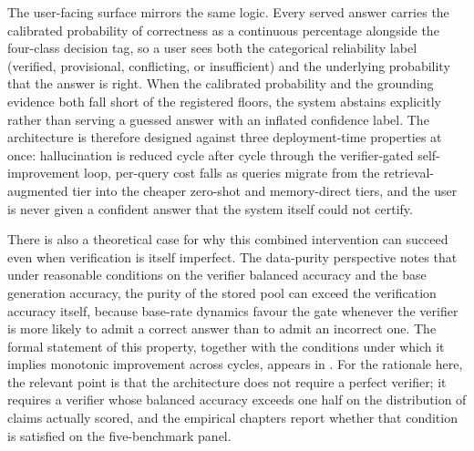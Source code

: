 The user-facing surface mirrors the same logic. Every served answer carries the calibrated probability of correctness as a continuous percentage alongside the four-class decision tag, so a user sees both the categorical reliability label (verified, provisional, conflicting, or insufficient) and the underlying probability that the answer is right. When the calibrated probability and the grounding evidence both fall short of the registered floors, the system abstains explicitly rather than serving a guessed answer with an inflated confidence label. The architecture is therefore designed against three deployment-time properties at once: hallucination is reduced cycle after cycle through the verifier-gated self-improvement loop, per-query cost falls as queries migrate from the retrieval-augmented tier into the cheaper zero-shot and memory-direct tiers, and the user is never given a confident answer that the system itself could not certify.

There is also a theoretical case for why this combined intervention can succeed even when verification is itself imperfect. The data-purity perspective notes that under reasonable conditions on the verifier balanced accuracy and the base generation accuracy, the purity of the stored pool can exceed the verification accuracy itself, because base-rate dynamics favour the gate whenever the verifier is more likely to admit a correct answer than to admit an incorrect one. The formal statement of this property, together with the conditions under which it implies monotonic improvement across cycles, appears in . For the rationale here, the relevant point is that the architecture does not require a perfect verifier; it requires a verifier whose balanced accuracy exceeds one half on the distribution of claims actually scored, and the empirical chapters report whether that condition is satisfied on the five-benchmark panel.

